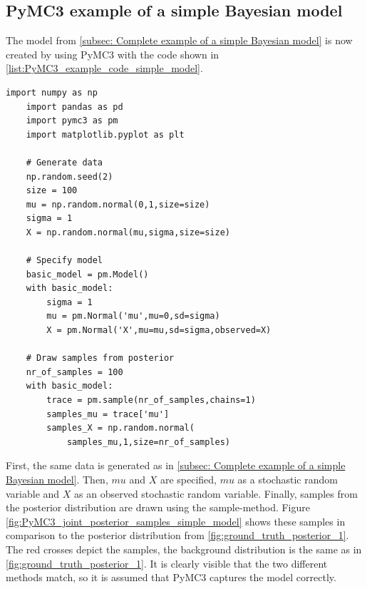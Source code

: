 \documentclass{article}
\begin{document}
\subsection{PyMC3 example of a simple Bayesian model}
\label{subsec: PyMC3 example of a simple Bayesian model}
The model from \autoref{subsec: Complete example of a simple Bayesian model} is now created by using PyMC3 with the code shown in \autoref{list:PyMC3_example_code_simple_model}.
\begin{lstlisting}[caption={Code used to specify the example model in PyMC3}, label={list:PyMC3_example_code_simple_model},captionpos=b]
    import numpy as np
    import pandas as pd
    import pymc3 as pm
    import matplotlib.pyplot as plt
	
    # Generate data
    np.random.seed(2)
    size = 100
    mu = np.random.normal(0,1,size=size)
    sigma = 1
    X = np.random.normal(mu,sigma,size=size)
	
    # Specify model
    basic_model = pm.Model()
    with basic_model:
        sigma = 1
        mu = pm.Normal('mu',mu=0,sd=sigma)
        X = pm.Normal('X',mu=mu,sd=sigma,observed=X)
	
    # Draw samples from posterior
    nr_of_samples = 100
    with basic_model:
        trace = pm.sample(nr_of_samples,chains=1)
        samples_mu = trace['mu']
        samples_X = np.random.normal(
            samples_mu,1,size=nr_of_samples)
\end{lstlisting}
First, the same data is generated as in \autoref{subsec: Complete example of a simple Bayesian model}. Then, $mu$ and $X$ are specified, $mu$ as a stochastic random variable and $X$ as an observed stochastic random variable. Finally, samples from the posterior distribution are drawn using the sample-method. 
Figure \ref{fig:PyMC3_joint_posterior_samples_simple_model} shows these samples in comparison to the posterior distribution from \autoref{fig:ground_truth_posterior_1}. The red crosses depict the samples, the background distribution is the same as in \autoref{fig:ground_truth_posterior_1}. It is clearly visible that the two different methods match, so it is assumed that PyMC3 captures the model correctly.
\end{document}
